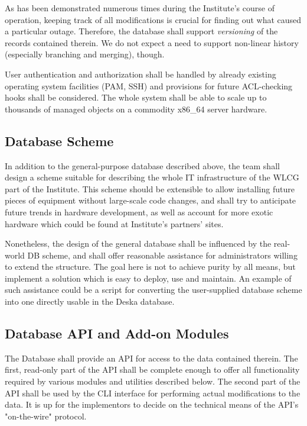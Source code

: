 \documentclass{article}
\begin{document}
As has been demonstrated numerous times during the Institute's course of operation, keeping track of all modifications is crucial
for finding out what caused a particular outage.  Therefore, the database shall support {\em versioning} of the records contained
therein.  We do not expect a need to support non-linear history (especially branching and merging), though.

User authentication and authorization shall be handled by already existing operating system facilities (PAM, SSH) and provisions
for future ACL-checking hooks shall be considered.  The whole system shall be able to scale up to thousands of managed objects on
a commodity x86\_64 server hardware.

\subsection{Database Scheme}

In addition to the general-purpose database described above,
the team shall design a scheme suitable for describing the whole IT infrastructure of the WLCG part of the Institute.
This scheme should be extensible to allow installing future pieces of equipment without large-scale code changes, and shall try to
anticipate future trends in hardware development, as well as account for more exotic hardware which could be found at Institute's
partners' sites.

Nonetheless, the design of the general database shall be influenced by the real-world DB scheme, and shall offer reasonable
assistance for administrators willing to extend the structure.  The goal here is not to achieve purity by all means, but implement
a solution which is easy to deploy, use and maintain. An example of such assistance could be a script for converting the
user-supplied database scheme into one directly usable in the Deska database. 

\subsection{Database API and Add-on Modules}

The Database shall provide an API for access to the data contained therein. The first, read-only part of the API shall be complete
enough to offer all functionality required by various modules and utilities described below.  The second part of the API shall
be used by the CLI interface for performing actual modifications to the data.  It is up for the implementors to decide on the
technical means of the API's "on-the-wire" protocol.
\end{document}
